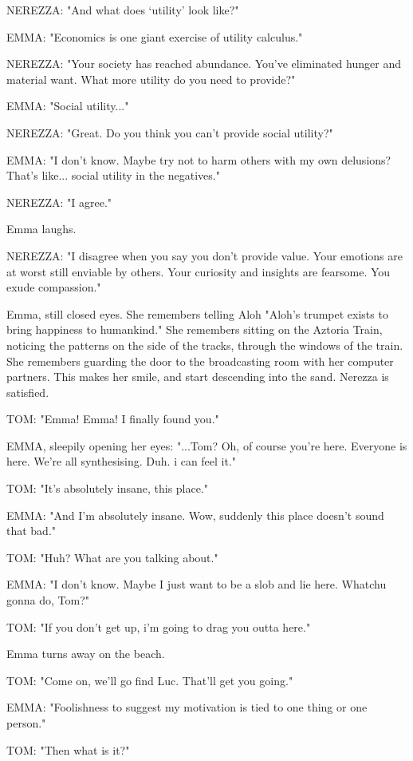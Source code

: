 \documentclass[11pt]{article}
\begin{document}
NEREZZA: "And what does `utility' look like?"

EMMA: "Economics is one giant exercise of utility calculus."

NEREZZA: "Your society has reached abundance.
You've eliminated hunger and material want.
What more utility do you need to provide?"

EMMA: "Social utility..."

NEREZZA: "Great. Do you think you can't provide social utility?"

EMMA: "I don't know. 
Maybe try not to harm others with my own delusions?
That's like... social utility in the negatives."

NEREZZA: "I agree."

Emma laughs.

NEREZZA: "I disagree when you say you don't provide value.
Your emotions are at worst still enviable by others.
Your curiosity and insights are fearsome.
You exude compassion."

Emma, still closed eyes.
She remembers telling Aloh "Aloh's trumpet exists to bring happiness to humankind."
She remembers sitting on the Aztoria Train, noticing the patterns on the side of the tracks, through the windows of the train.
She remembers guarding the door to the broadcasting room with her computer partners.
This makes her smile, and start descending into the sand.
Nerezza is satisfied.

TOM: "Emma! Emma! I finally found you."

EMMA, sleepily opening her eyes: "...Tom? 
Oh, of course you're here. 
Everyone is here.
We're all synthesising. Duh.
i can feel it."

TOM: "It's absolutely insane, this place."

EMMA: "And I'm absolutely insane. Wow, suddenly this place doesn't sound that bad."

TOM: "Huh? What are you talking about."

EMMA: "I don't know.
Maybe I just want to be a slob and lie here.
Whatchu gonna do, Tom?"

TOM: "If you don't get up, i'm going to drag you outta here."

Emma turns away on the beach.

TOM: "Come on, we'll go find Luc.
That'll get you going."

EMMA: "Foolishness to suggest my motivation is tied to one thing or one person."

TOM: "Then what is it?"
\end{document}

